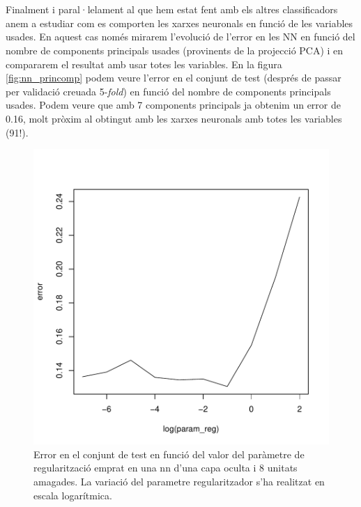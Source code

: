 \documentclass[a4paper,10pt]{article}
\begin{document}
\\
\\
Finalment i paral·lelament al que hem estat fent amb els altres classificadors anem a estudiar com es comporten les xarxes neuronals en funció de les variables usades. En aquest cas només mirarem l'evolució de l'error en les NN en funció del nombre de components principals usades (provinents de la projecció PCA) i en compararem el resultat amb usar totes les variables. En la figura \ref{fig:nn_princomp} podem veure l'error en el conjunt de test (després de passar per validació creuada 5-\textit{fold}) en funció del nombre de components principals usades. Podem veure que amb 7 components principals ja obtenim un error de 0.16, molt pròxim al obtingut amb les xarxes neuronals amb totes les variables (91!).



\begin{center}
\begin{figure}
\includegraphics[width=5in]{memoria-nn_regular}
\caption{Error en el conjunt de test en funció del valor del paràmetre de regularització emprat en una nn d'una capa oculta i 8 unitats amagades. La variació del parametre regularitzador s'ha realitzat en escala logarítmica.} \label{fig:nn_regular}
\end{figure}
\end{center}
\end{document}
